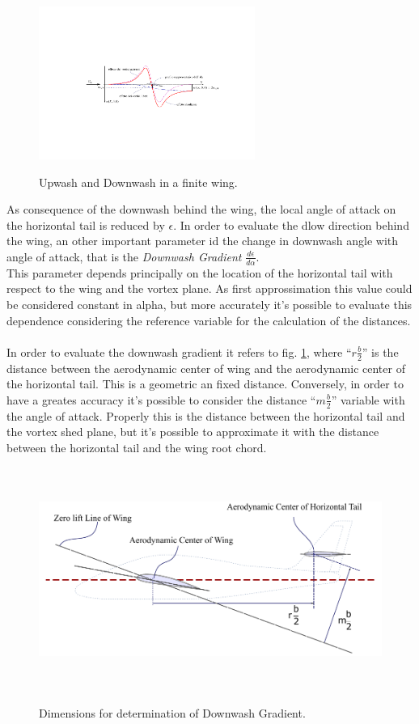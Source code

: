 \begin{figure}[H]
\centering
{\includegraphics[height=5cm]{Immagini/wing_upwash_downwash.pdf}} 
\caption{Upwash and Downwash in a finite wing.}
\end{figure}

As consequence of the downwash behind the wing, the local angle of attack on the horizontal tail is reduced by  $\epsilon$. In order to evaluate the dlow direction behind the wing, an other important parameter id the change in downwash angle with angle of attack, that is the {\itshape Downwash Gradient } $\frac{d\epsilon}{d\alpha}$.\\
This parameter depends principally on the location of the horizontal tail with respect to the wing and the vortex plane. As first approssimation this value could be considered constant in alpha, but more accurately it's possible to evaluate this dependence considering the reference variable for the calculation of the distances. \\ \\

In order to evaluate the downwash gradient it refers to fig. \ref{PerkinsDownwash}, where ``$r \frac{b}{2}$''  is the distance between the aerodynamic center of wing and the aerodynamic center of the horizontal tail. This is a geometric an fixed distance. Conversely,  in order to have a greates accuracy it's possible to consider the distance ``$m  \frac{b}{2}$'' variable with the angle of attack. Properly this is the distance between the horizontal tail and the vortex shed plane, but it's possible to approximate it with the distance between the horizontal tail and the wing root chord.

\begin{figure}[H]
\centering
{\includegraphics[height=7.3cm]{Immagini/wing_htail_Roskam_eng.pdf}} 
\caption{Dimensions for determination of Downwash Gradient.}
\label{PerkinsDownwash}
\end{figure} 

